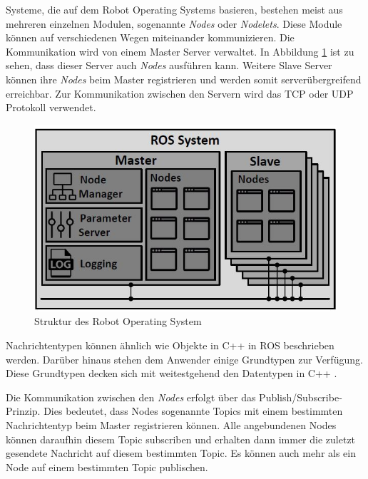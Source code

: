 Systeme, die auf dem Robot Operating Systems basieren, bestehen meist aus mehreren einzelnen Modulen, sogenannte \textit{Nodes} oder \textit{Nodelets}. Diese Module können auf verschiedenen Wegen miteinander kommunizieren. Die Kommunikation wird von einem Master Server verwaltet.  
In Abbildung \ref{ros:str} ist zu sehen, dass dieser Server auch \textit{Nodes} ausführen kann. Weitere Slave Server können ihre \textit{Nodes} beim Master registrieren und werden somit serverübergreifend erreichbar. Zur Kommunikation zwischen den Servern wird das TCP oder UDP Protokoll verwendet.
\FloatBarrier
\begin{figure}[h]
  \centering
  \includegraphics[width=\textwidth]{images/stand_der_technik/ROS_AS.JPG}
  \caption[Struktur des Robot Operating System]{Struktur des Robot Operating System}
  \label{ros:str}
\end{figure}
\FloatBarrier
Nachrichtentypen können ähnlich wie Objekte in C++ in ROS beschrieben werden. Darüber hinaus stehen dem Anwender einige Grundtypen zur Verfügung. Diese Grundtypen decken sich mit weitestgehend den Datentypen in C++ \cite{AND16}.

Die Kommunikation zwischen den \textit{Nodes} erfolgt über das Publish/Subscribe-Prinzip. Dies bedeutet, dass Nodes sogenannte Topics mit einem bestimmten Nachrichtentyp beim Master registrieren können. Alle angebundenen Nodes können daraufhin diesem Topic subscriben und erhalten dann immer die zuletzt gesendete Nachricht auf diesem bestimmten Topic. Es können auch mehr als ein Node auf einem bestimmten Topic publischen.

